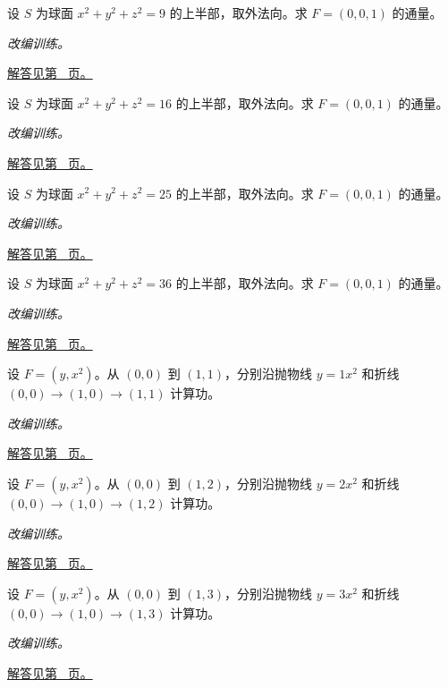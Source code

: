 \documentclass[UTF8,12pt,a4paper,fontset=fandol]{ctexart}
\begin{document}
\begin{example}[上半球上的常向量通量]\label{ex:c42q15}
设 $S$ 为球面 $x^2+y^2+z^2=9$ 的上半部，取外法向。求 $F=(0,0,1)$ 的通量。
\par\textit{改编训练。}\par\hyperref[ans:c42q15]{解答见第~\pageref{ans:c42q15} 页。}
\end{example}
\begin{example}[上半球上的常向量通量]\label{ex:c42q16}
设 $S$ 为球面 $x^2+y^2+z^2=16$ 的上半部，取外法向。求 $F=(0,0,1)$ 的通量。
\par\textit{改编训练。}\par\hyperref[ans:c42q16]{解答见第~\pageref{ans:c42q16} 页。}
\end{example}
\begin{example}[上半球上的常向量通量]\label{ex:c42q17}
设 $S$ 为球面 $x^2+y^2+z^2=25$ 的上半部，取外法向。求 $F=(0,0,1)$ 的通量。
\par\textit{改编训练。}\par\hyperref[ans:c42q17]{解答见第~\pageref{ans:c42q17} 页。}
\end{example}
\begin{example}[上半球上的常向量通量]\label{ex:c42q18}
设 $S$ 为球面 $x^2+y^2+z^2=36$ 的上半部，取外法向。求 $F=(0,0,1)$ 的通量。
\par\textit{改编训练。}\par\hyperref[ans:c42q18]{解答见第~\pageref{ans:c42q18} 页。}
\end{example}
\begin{example}[两条路径给出不同功]\label{ex:c42q19}
设 $F=(y,x^2)$。从 $(0,0)$ 到 $(1,1)$，分别沿抛物线 $y=1x^2$ 和折线 $(0,0)\to(1,0)\to(1,1)$ 计算功。
\par\textit{改编训练。}\par\hyperref[ans:c42q19]{解答见第~\pageref{ans:c42q19} 页。}
\end{example}
\begin{example}[两条路径给出不同功]\label{ex:c42q20}
设 $F=(y,x^2)$。从 $(0,0)$ 到 $(1,2)$，分别沿抛物线 $y=2x^2$ 和折线 $(0,0)\to(1,0)\to(1,2)$ 计算功。
\par\textit{改编训练。}\par\hyperref[ans:c42q20]{解答见第~\pageref{ans:c42q20} 页。}
\end{example}
\begin{example}[两条路径给出不同功]\label{ex:c42q21}
设 $F=(y,x^2)$。从 $(0,0)$ 到 $(1,3)$，分别沿抛物线 $y=3x^2$ 和折线 $(0,0)\to(1,0)\to(1,3)$ 计算功。
\par\textit{改编训练。}\par\hyperref[ans:c42q21]{解答见第~\pageref{ans:c42q21} 页。}
\end{example}
\end{document}
